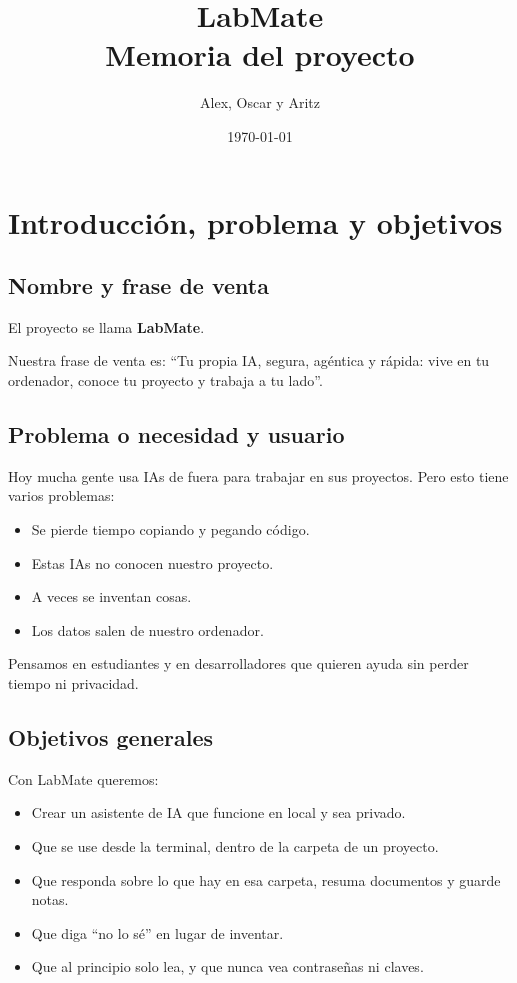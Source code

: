 \documentclass[12pt,a4paper]{report}
\title{LabMate\\Memoria del proyecto}
\author{Alex, Oscar y Aritz}
\date{\today}
\begin{document}
\maketitle

\chapter{Introducción, problema y objetivos}

\section{Nombre y frase de venta}

El proyecto se llama \textbf{LabMate}.

Nuestra frase de venta es: ``Tu propia IA, segura, agéntica y rápida: vive en tu ordenador, conoce tu proyecto y trabaja a tu lado''.

\section{Problema o necesidad y usuario}

Hoy mucha gente usa IAs de fuera para trabajar en sus proyectos. Pero esto tiene varios problemas:

\begin{itemize}
  \item Se pierde tiempo copiando y pegando código.
  \item Estas IAs no conocen nuestro proyecto.
  \item A veces se inventan cosas.
  \item Los datos salen de nuestro ordenador.
\end{itemize}

Pensamos en estudiantes y en desarrolladores que quieren ayuda sin perder tiempo ni privacidad.

\section{Objetivos generales}

Con LabMate queremos:

\begin{itemize}
  \item Crear un asistente de IA que funcione en local y sea privado.
  \item Que se use desde la terminal, dentro de la carpeta de un proyecto.
  \item Que responda sobre lo que hay en esa carpeta, resuma documentos y guarde notas.
  \item Que diga ``no lo sé'' en lugar de inventar.
  \item Que al principio solo lea, y que nunca vea contraseñas ni claves.
\end{itemize}
\end{document}
